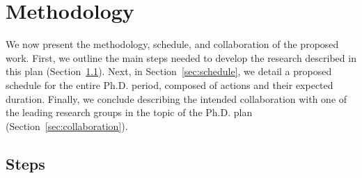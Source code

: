 \chapter{Methodology}\label{cap:methodology}
\thispagestyle{empty}

We now present the methodology, schedule, and collaboration of the proposed work. First, we outline the main steps needed to develop the research described in this plan (Section~\ref{sec:steps}). Next, in Section~\ref{sec:schedule}, we detail a proposed schedule for the entire Ph.D. period, composed of actions and their expected duration. Finally, we conclude describing the intended collaboration with one of the leading research groups in the topic of the Ph.D. plan (Section~\ref{sec:collaboration}). 

\section{Steps}
\label{sec:steps}


